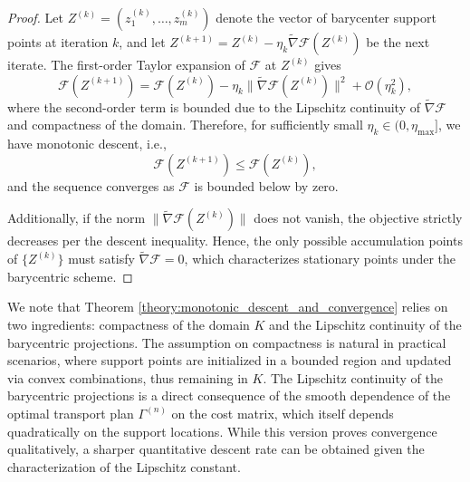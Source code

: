 \documentclass[11pt]{article}
\begin{document}
\begin{proof}
    Let $Z^{(k)} = (z_1^{(k)}, \ldots, z_m^{(k)})$ denote the vector of barycenter support points at iteration $k$, and let $Z^{(k+1)} = Z^{(k)} - \eta_k \widetilde{\nabla}\mathcal{F}(Z^{(k)})$ be the next iterate. The first-order Taylor expansion of $\mathcal{F}$ at $Z^{(k)}$ gives
    \begin{equation*}
        \mathcal{F}(Z^{(k+1)}) = \mathcal{F}(Z^{(k)}) - \eta_k \|\widetilde{\nabla} \mathcal{F}(Z^{(k)})\|^2 + \mathcal{O}(\eta_k^2),
    \end{equation*}
    where the second-order term is bounded due to the Lipschitz continuity of $\widetilde{\nabla} \mathcal{F}$ and compactness of the domain. Therefore, for sufficiently small $\eta_k \in (0, \eta_{\max}]$, we have monotonic descent, i.e., 
    \[
    \mathcal{F}(Z^{(k+1)}) \leq \mathcal{F}(Z^{(k)}),
    \]
    and the sequence converges as $\mathcal{F}$ is bounded below by zero.

    Additionally, if the norm $\|\widetilde{\nabla} \mathcal{F}(Z^{(k)})\|$ does not vanish, the objective strictly decreases per the descent inequality. Hence, the only possible accumulation points of $\{Z^{(k)}\}$ must satisfy $\widetilde{\nabla} \mathcal{F} = 0$, which characterizes stationary points under the barycentric scheme.
\end{proof}




We note that Theorem \ref{theory:monotonic_descent_and_convergence} relies on two ingredients: compactness of the domain $K$ and the Lipschitz continuity of the barycentric projections. The assumption on compactness is natural in practical scenarios, where support points are initialized in a bounded region and updated via convex combinations, thus remaining in $K$. The Lipschitz continuity of the barycentric projections is a direct consequence of the smooth dependence of the optimal transport plan $\Gamma^{(n)}$ on the cost matrix, which itself depends quadratically on the support locations. While this version proves convergence qualitatively, a sharper quantitative descent rate can be obtained given the characterization of the Lipschitz constant.
\end{document}
